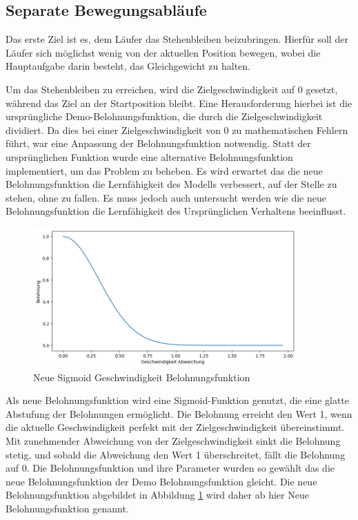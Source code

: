 \subsection{Separate Bewegungsabläufe}

Das erste Ziel ist es, dem Läufer das Stehenbleiben beizubringen. Hierfür soll der Läufer sich möglichst wenig von der aktuellen Position bewegen, wobei die Hauptaufgabe darin besteht, das Gleichgewicht zu halten.

Um das Stehenbleiben zu erreichen, wird die Zielgeschwindigkeit auf 0 gesetzt, während das Ziel an der Startposition bleibt. Eine Herausforderung hierbei ist die ursprüngliche Demo-Belohnungsfunktion, die durch die Zielgeschwindigkeit dividiert. Da dies bei einer Zielgeschwindigkeit von 0 zu mathematischen Fehlern führt, war eine Anpassung der Belohnungsfunktion notwendig. Statt der ursprünglichen Funktion wurde eine alternative Belohnungsfunktion implementiert, um das Problem zu beheben. Es wird erwartet das die neue Belohnungsfunktion die Lernfähigkeit des Modells verbessert, auf der Stelle zu stehen, ohne zu fallen. Es muss jedoch auch untersucht werden wie die neue Belohnungsfunktion die Lernfähigkeit des Ursprünglichen Verhaltens beeinflusst.

\begin{figure}[H]
  \centering  
  \includegraphics[width=0.9\textwidth]{img/plot_vel_reward_neu}
  \caption{Neue Sigmoid Geschwindigkeit Belohnungsfunktion}
  \label{fig:plot_vel_reward_neu}
\end{figure}

Als neue Belohnungsfunktion wird eine Sigmoid-Funktion genutzt, die eine glatte Abstufung der Belohnungen ermöglicht. Die Belohnung erreicht den Wert 1, wenn die aktuelle Geschwindigkeit perfekt mit der Zielgeschwindigkeit übereinstimmt. Mit zunehmender Abweichung von der Zielgeschwindigkeit sinkt die Belohnung stetig, und sobald die Abweichung den Wert 1 überschreitet, fällt die Belohnung auf 0. Die Belohnungsfunktion und ihre Parameter wurden so gewählt das die neue Belohnungsfunktion der Demo Belohnungsfunktion gleicht. Die neue Belohnungsfunktion abgebildet in Abbildung \ref{fig:plot_vel_reward_neu} wird daher ab hier Neue Belohnungsfunktion genannt.

